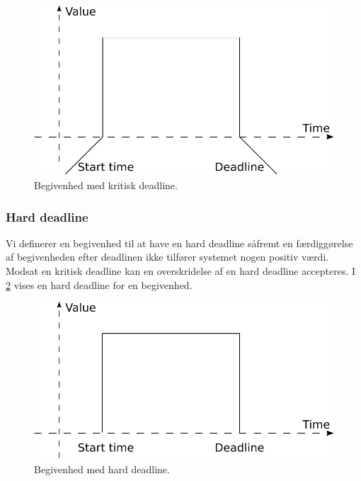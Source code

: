 \begin{figure}
 \begin{center}
  \includegraphics[scale=0.75]{images/critical-deadline}
	\caption{Begivenhed med kritisk deadline.}
	\label{fig:hard-rtp}
\end{center}
\end{figure}


\subsubsection{Hard deadline}
Vi definerer en begivenhed til at have en hard deadline såfremt en færdiggørelse af begivenheden efter deadlinen ikke tilfører systemet nogen positiv værdi. Modsat en kritisk deadline kan en overskridelse af en hard deadline accepteres. I \cref{fig:hard-dl} vises en hard deadline for en begivenhed. 

\begin{figure}
 \begin{center}
  \includegraphics[scale=0.75]{images/hard-deadline}
	\caption{Begivenhed med hard deadline.}
	\label{fig:hard-dl}
\end{center}
\end{figure}

